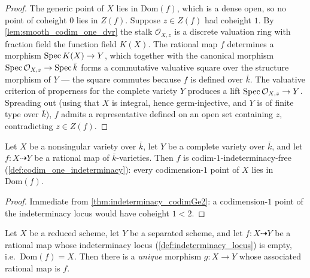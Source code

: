 \begin{proof}
  \leanok
  The generic point of \(X\) lies in \(\mathrm{Dom}(f)\), which is a dense
  open, so no point of coheight \(0\) lies in \(Z(f)\). Suppose \(z \in Z(f)\)
  had coheight \(1\). By \cref{lem:smooth_codim_one_dvr} the stalk
  \(\mathcal O_{X,z}\) is a discrete valuation ring with fraction field the
  function field \(K(X)\). The rational map \(f\) determines a morphism
  \(\operatorname{Spec} K(X) \to Y\), which together with the canonical morphism
  \(\operatorname{Spec} \mathcal O_{X,z} \to \operatorname{Spec} \bar k\) forms a commutative valuative
  square over the structure morphism of \(Y\) --- the square commutes
  because \(f\) is defined over \(\bar k\). The valuative criterion of
  properness for the complete variety \(Y\) produces a lift
  \(\operatorname{Spec} \mathcal O_{X,z} \to Y\). Spreading out (using that \(X\) is
  integral, hence germ-injective, and \(Y\) is of finite type over
  \(\bar k\)), \(f\) admits a representative defined on an open set
  containing \(z\), contradicting \(z \in Z(f)\).
\end{proof}


\begin{corollary}
  \label{cor:codim_one_free}
  Let \(X\) be a nonsingular variety over \(\bar k\), let \(Y\) be a complete variety
  over \(\bar k\), and let \(f \colon X \dashrightarrow Y\) be a rational map of
  \(\bar k\)-varieties. Then \(f\) is codim-\(1\)-indeterminacy-free
  (\cref{def:codim_one_indeterminacy}): every codimension-\(1\) point of \(X\) lies in
  \(\mathrm{Dom}(f)\).
\end{corollary}

\begin{proof}
  \leanok
  Immediate from \cref{thm:indeterminacy_codimGe2}: a codimension-\(1\) point of the
  indeterminacy locus would have coheight \(1 < 2\).
\end{proof}

\begin{theorem}
  \label{thm:codim_one_extension}
  Let \(X\) be a reduced scheme, let \(Y\) be a separated scheme, and let
  \(f \colon X \dashrightarrow Y\) be a rational map whose indeterminacy locus
  (\cref{def:indeterminacy_locus}) is empty, i.e.\ \(\mathrm{Dom}(f) = X\). Then there
  is a \emph{unique} morphism \(g \colon X \to Y\) whose associated rational map is
  \(f\).
\end{theorem}

